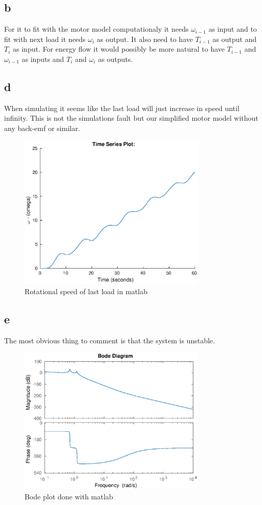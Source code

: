 \documentclass[11pt]{article}
\begin{document}
\subsection*{b}
For it to fit with the motor model computationaly it needs $\omega_{i-1}$ as input and to fit with next load it needs $\omega_{i}$ as output. It also need to have $T_{i-1}$ as output and $T_i$ as input. For energy flow it would possibly be more natural to have $T_{i-1}$ and $\omega_{i-1}$ as inputs and $T_i$ and $\omega_i$ as outputs.

\subsection*{d}
When simulating it seems like the last load will just increase in speed until infinity. This is not the simulations fault but our simplified motor model without any back-emf or similar.
\begin{figure}[H]
\centering
\includegraphics[width=0.8\textwidth]{matlabRotationalSpeed.eps}
\caption{Rotational speed of last load in matlab}
\end{figure}

\subsection*{e}
The most obvious thing to comment is that the system is unstable.
\begin{figure}[H]
\centering
\includegraphics[width=0.8\textwidth]{matlabBode.eps}
\caption{Bode plot done with matlab}
\end{figure}
\end{document}
